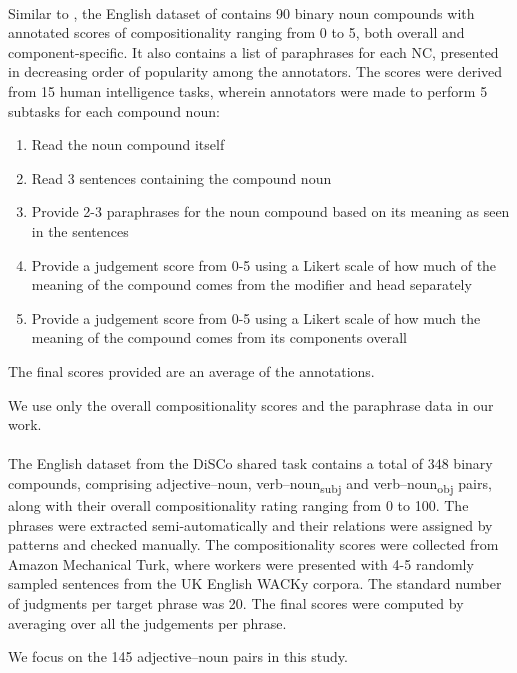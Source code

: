 \paragraph{\ramisch}
Similar to \reddy, the English dataset of \cite{Ramisch2016} contains 90 binary noun compounds with annotated scores of compositionality ranging from 0 to 5, both overall and component-specific. It also contains a list of paraphrases for each NC, presented in decreasing order of popularity among the annotators. The scores were derived from 15 human intelligence tasks, wherein annotators were made to perform 5 subtasks for each compound noun:
\begin{enumerate}
    \item Read the noun compound itself
    \item Read 3 sentences containing the compound noun
    \item Provide 2-3 paraphrases for the noun compound based on its meaning as seen in the sentences
    \item Provide a judgement score from 0-5 using a Likert scale of how much of the meaning of the compound comes from the modifier and head separately
    \item Provide a judgement score from 0-5 using a Likert scale of how much the meaning of the compound comes from its components overall
\end{enumerate}
The final scores provided are an average of the annotations.

\noindent
We use only the overall compositionality scores and the paraphrase data in our work.
\paragraph{\discoj}
The English dataset from the DiSCo shared task \citep{Disco2011} contains a total of 348 binary compounds, comprising adjective--noun, verb--noun\textsubscript{subj} and verb--noun\textsubscript{obj} pairs, along with their overall compositionality rating ranging from 0 to 100. The phrases were extracted semi-automatically and their relations were assigned by patterns and checked manually. The compositionality scores were collected from Amazon Mechanical Turk, where workers were presented with 4-5 randomly sampled sentences from the UK English WACKy corpora. The standard number of judgments per target phrase was 20. The final scores were computed by averaging over all the judgements per phrase.

\noindent
We focus on the 145 adjective--noun pairs in this study.
